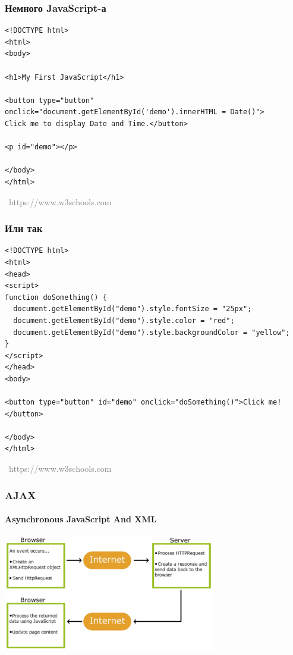 \documentclass[xetex,mathserif,serif]{beamer}
\newcommand{\attribution}[1] {
\vspace{-5mm}\begin{flushright}\begin{scriptsize}\textcolor{gray}{\textcopyright\, #1}\end{scriptsize}\end{flushright}
}
\begin{document}
    \begin{frame}[fragile]
        \frametitle{Немного JavaScript-а}
        \begin{verbatim}
<!DOCTYPE html>
<html>
<body>

<h1>My First JavaScript</h1>

<button type="button"
onclick="document.getElementById('demo').innerHTML = Date()">
Click me to display Date and Time.</button>

<p id="demo"></p>

</body>
</html> 
        \end{verbatim}
        \attribution{https://www.w3schools.com}
    \end{frame}

    \begin{frame}[fragile]
        \frametitle{Или так}
        \begin{small}
            \begin{verbatim}
<!DOCTYPE html>
<html>
<head>
<script>
function doSomething() {
  document.getElementById("demo").style.fontSize = "25px";
  document.getElementById("demo").style.color = "red";
  document.getElementById("demo").style.backgroundColor = "yellow";
}
</script>
</head>
<body>

<button type="button" id="demo" onclick="doSomething()">Click me!</button>

</body>
</html>
            \end{verbatim}
        \end{small}
        \vspace{-3mm}
        \attribution{https://www.w3schools.com}
    \end{frame}

    \begin{frame}
        \frametitle{AJAX}
        \framesubtitle{Asynchronous JavaScript And XML}
        \begin{center}
            \includegraphics[width=0.7\textwidth]{ajax.png}
        \end{center}
    \end{frame}
\end{document}
